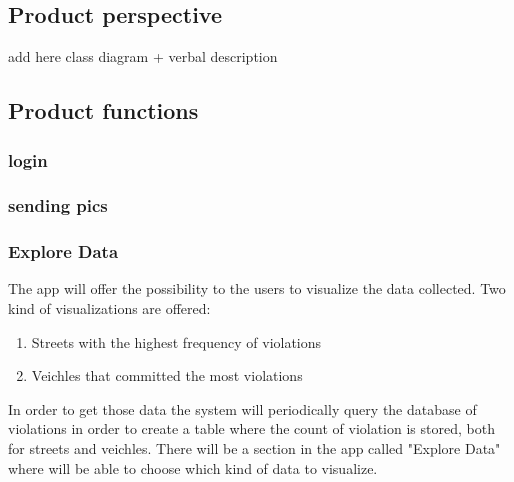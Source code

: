 



\subsection{Product perspective }


add here class diagram + verbal description





\subsection{Product functions}

\subsubsection{login }
\subsubsection{sending pics}
\subsubsection{Explore Data}
The app will offer the possibility to the users to visualize the data collected.
Two kind of visualizations are offered:
\begin{enumerate}
  \item Streets with the highest frequency of violations
  \item Veichles that committed the most violations
\end{enumerate}
In order to get those data the system will periodically query the database of violations in order to create a table where the count of violation is stored, both for streets and veichles.
There will be a section in the app called "Explore Data" where will be able to choose which kind of data to visualize.



